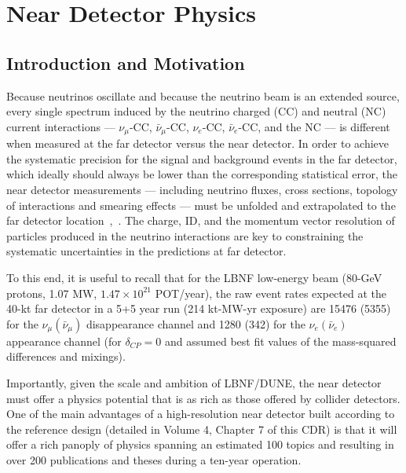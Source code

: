 
\chapter{Near Detector Physics}
\label{ch:physics-nd}

\section{Introduction and Motivation}
\label{sec:physics-nd-introduction}

Because neutrinos oscillate and because the neutrino beam is an extended  source, every single 
spectrum induced by the neutrino charged (CC) and neutral (NC) current interactions --- $\nu_\mu$-CC, 
$\bar \nu_\mu$-CC, $\nu_e$-CC, $\bar \nu_e$-CC, and the NC --- is different when measured at the far detector versus 
the near detector. 
In order to achieve the systematic precision for the signal and background events  in the far detector,  
which ideally should always be lower than the corresponding statistical error, the near detector 
measurements ---  including neutrino fluxes,  cross sections, topology of 
interactions and smearing effects --- must be unfolded and extrapolated to the far detector 
location~\cite{near-detector-REQ1},~\cite{near-detector-REQ2}.  The charge, ID,  and the momentum vector resolution of 
particles produced in the neutrino interactions are %
key to constraining  the systematic 
uncertainties in the predictions at far detector. 
%

To this end, it is useful to recall that for the LBNF low-energy beam 
(80-GeV protons, 1.07 MW, $1.47 \times 10^{21} $ POT/year), the raw event rates expected at the  
40-kt far detector in a 5+5 year run (214 kt-MW-yr exposure) are 15476 (5355) for 
the $\nu_\mu (\bar \nu_\mu)$ disappearance channel 
and 1280 (342) for the $\nu_e(\bar \nu_e)$ appearance channel (for $\delta_{CP}=0$ and assumed 
best fit values of the mass-squared differences and mixings). 


Importantly, given the scale and ambition of LBNF/DUNE, the near detector must offer a physics 
potential that is as rich as those offered by collider detectors. 
One of the main advantages of a high-resolution near detector built according to the reference design 
(detailed in Volume 4, Chapter 7 of  this CDR) is that it will offer a rich panoply of physics %
spanning an estimated 100 topics and  resulting in over 200 publications and theses during a ten-year operation. 

